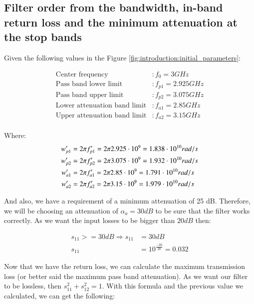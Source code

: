 \documentclass[12pt]{report} %
\begin{document}
\subsection{Filter order from the bandwidth, in-band return loss and the minimum attenuation at the stop bands}

Given the following values in the Figure \ref{fig:introduction:initial_parameters}:

\begin{align*}
\text{Center frequency} & : f_0 = 3 GHz\\
\text{Pass band lower limit} & : f_{p1} = 2.925 GHz\\
\text{Pass band upper limit} & : f_{p2} = 3.075 GHz\\
\text{Lower attenuation band limit} & : f_{a1} = 2.85 GHz\\
\text{Upper attenuation band limit} & : f_{a2} = 3.15 GHz\\
\end{align*}

Where:
\begin{align*}
w'_{p1} &= 2 \* \pi \* f'_{p1} = 2 \* \pi \* 2.925 \cdot 10^9 = 1.838 \cdot 10^{10} rad/s \\
w'_{p2} &= 2 \* \pi \* f'_{p2} = 2 \* \pi \* 3.075 \cdot 10^9 = 1.932 \cdot 10^{10} rad/s \\
w'_{a1} &= 2 \* \pi \* f'_{a1} = 2 \* \pi \* 2.85 \cdot 10^9 = 1.791 \cdot 10^{10} rad/s \\
w'_{a2} &= 2 \* \pi \* f'_{a2} = 2 \* \pi \* 3.15 \cdot 10^9 = 1.979 \cdot 10^{10} rad/s \\
\end{align*}

And also, we have a requirement of a minimum attenuation of 25 dB. Therefore, we will be choosing an attenuation of $\alpha_{a} = 30 dB$ to be sure that the filter works correctly. As we want the input losses to be bigger than $20 dB$ then:

\begin{align*}
s_{11} >= 30 dB \Rightarrow s_{11} &= 30 dB \\
s_{11} &= 10^{\frac{-30}{20}} = 0.032
\end{align*}

Now that we have the return loss, we can calculate the maximum transmission loss (or better said the maximum pass band attenuation). As we want our filter to be lossless, then $s_{11}^2 + s_{12}^2 = 1$. With this formula and the previous value we calculated, we can get the following:
\end{document}
